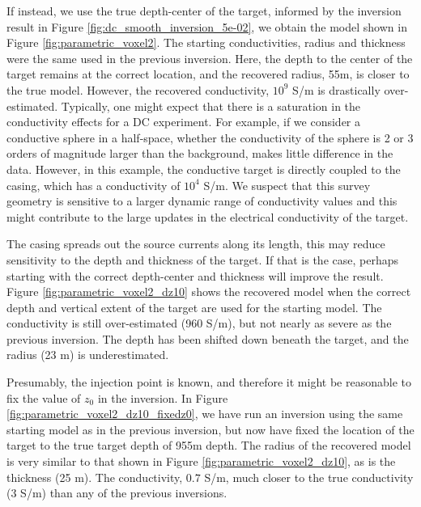 If instead, we use the true depth-center of the target, informed by the inversion result in Figure \ref{fig:dc_smooth_inversion_5e-02}, we obtain the model shown in Figure \ref{fig:parametric_voxel2}. The starting conductivities, radius and thickness were the same used in the previous inversion. Here, the depth to the center of the target remains at the correct location, and the recovered radius, 55m, is closer to the true model. However, the recovered conductivity, $10^9$ S/m is drastically over-estimated. Typically, one might expect that there is a saturation in the conductivity effects for a DC experiment. For example, if we consider a conductive sphere in a half-space, whether the conductivity of the sphere is 2 or 3 orders of magnitude larger than the background, makes little difference in the data. However, in this example, the conductive target is directly coupled to the casing, which has a conductivity of $10^4$ S/m. We suspect that this survey geometry is sensitive to a larger dynamic range of conductivity values and this might contribute to the large updates in the electrical conductivity of the target.



The casing spreads out the source currents along its length, this may reduce sensitivity to the depth and thickness of the target. If that is the case, perhaps starting with the correct depth-center and thickness will improve the result. Figure \ref{fig:parametric_voxel2_dz10} shows the recovered model when the correct depth and vertical extent of the target are used for the starting model. The conductivity is still over-estimated (960 S/m), but not nearly as severe as the previous inversion. The depth has been shifted down beneath the target, and the radius (23 m) is underestimated.




Presumably, the injection point is known, and therefore it might be reasonable to fix the value of $z_0$ in the inversion. In Figure \ref{fig:parametric_voxel2_dz10_fixedz0}, we have run an inversion using the same starting model as in the previous inversion, but now have fixed the location of the target to the true target depth of 955m depth. The radius of the recovered model is very similar to that shown in Figure \ref{fig:parametric_voxel2_dz10}, as is the thickness (25 m). The conductivity, $0.7$ S/m, much closer to the true conductivity (3 S/m) than any of the previous inversions.






